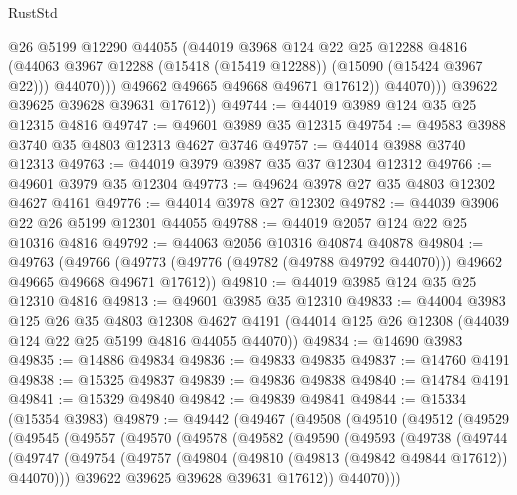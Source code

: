 \begin{lexlean}{RustStd}
\begin{coremodule}
                      @26
                      @5199
                      @12290
                      @44055
                      (@44019
                        @3968
                        @124
                        @22
                        @25
                        @12288
                        @4816
                        (@44063 @3967 @12288 (@15418 (@15419 @12288)) (@15090 (@15424 @3967 @22)))
                        @44070)))
                  @49662
                  @49665
                  @49668
                  @49671
                  @17612))
              @44070)))
        @39622
        @39625
        @39628
        @39631
        @17612))
@49744 := @44019 @3989 @124 @35 @25 @12315 @4816
@49747 := @49601 @3989 @35 @12315
@49754 := @49583 @3988 @3740 @35 @4803 @12313 @4627 @3746
@49757 := @44014 @3988 @3740 @12313
@49763 := @44019 @3979 @3987 @35 @37 @12304 @12312
@49766 := @49601 @3979 @35 @12304
@49773 := @49624 @3978 @27 @35 @4803 @12302 @4627 @4161
@49776 := @44014 @3978 @27 @12302
@49782 := @44039 @3906 @22 @26 @5199 @12301 @44055
@49788 := @44019 @2057 @124 @22 @25 @10316 @4816
@49792 := @44063 @2056 @10316 @40874 @40878
@49804 := @49763
    (@49766 (@49773 (@49776 (@49782 (@49788 @49792 @44070))) @49662 @49665 @49668 @49671 @17612))
@49810 := @44019 @3985 @124 @35 @25 @12310 @4816
@49813 := @49601 @3985 @35 @12310
@49833 := @44004
    @3983
    @125
    @26
    @35
    @4803
    @12308
    @4627
    @4191
    (@44014 @125 @26 @12308 (@44039 @124 @22 @25 @5199 @4816 @44055 @44070))
@49834 := @14690 @3983
@49835 := @14886 @49834
@49836 := @49833 @49835
@49837 := @14760 @4191
@49838 := @15325 @49837
@49839 := @49836 @49838
@49840 := @14784 @4191
@49841 := @15329 @49840
@49842 := @49839 @49841
@49844 := @15334 (@15354 @3983)
@49879 := @49442
    (@49467
      (@49508
        (@49510
          (@49512
            (@49529
              (@49545
                (@49557
                  (@49570
                    (@49578
                      (@49582
                        (@49590
                          (@49593
                            (@49738
                              (@49744
                                (@49747
                                  (@49754
                                    (@49757
                                      (@49804 (@49810 (@49813 (@49842 @49844 @17612)) @44070)))
                                    @39622
                                    @39625
                                    @39628
                                    @39631
                                    @17612))
                                @44070)))

\end{coremodule}
\end{lexlean}
